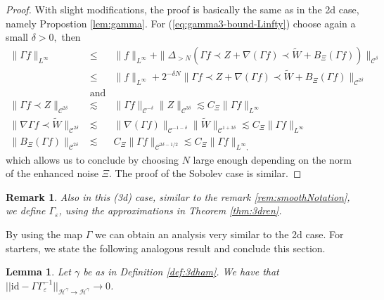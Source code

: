 \documentclass[11pt, oneside]{article}   	%
\newcommand{\nobracket}{}
\newcommand{\tmop}[1]{\ensuremath{\operatorname{#1}}}
\newtheorem{lemma}[theorem]{Lemma}
\newtheorem{remark}[theorem]{Remark}
\newcommand{\CC}{\mathscr{C}}
\begin{document}
\begin{proof}
	With slight modifications, the proof is basically the same as in the 2d case, namely Propostion \ref{lem:gamma}. For
	(\ref{eq:gamma3-bound-Linfty}) choose again a small $\delta > 0,$ then
	\begin{eqnarray*}
		\| \Gamma f \|_{L^{\infty}} & \le & \| f \|_{L^{\infty}} + \|
		\Delta_{> N} (\Gamma f \prec Z + \nabla (\Gamma f) \prec \widetilde{W} +
		B_{\Xi} (\Gamma f)) \|_{\CC^{\delta}}\\
		& \le & \| f \|_{L^{\infty}} + 2^{- \delta N} \| \nobracket \Gamma
		f \prec Z + \nabla (\Gamma f) \prec \widetilde{W} + B_{\Xi} (\Gamma f
		\nobracket) \|_{\CC^{2 \delta}}\\
		& \tmop{and} & \\
		\| \Gamma f \prec Z \|_{\CC^{2 \delta}} & \lesssim & \| \Gamma f
		\|_{\CC^{- \delta}} \| Z \|_{\CC^{3 \delta}} \lesssim
		C_{\Xi} \| \Gamma f \|_{L^{\infty}}\\
		\| \nabla \Gamma f \prec \widetilde{W} \|_{\CC^{2 \delta}} & \lesssim
		& \| \nabla (\Gamma f) \|_{\CC^{- 1 - \delta}} \| \widetilde{W}
		\|_{\CC^{1 + 3 \delta}} \lesssim C_{\Xi} \| \Gamma f
		\|_{L^{\infty}}\\
		\| B_{\Xi} (\Gamma f) \|_{\CC^{2 \delta}} & \lesssim & C_{\Xi} \| \Gamma f
		\|_{\CC^{2 \delta - 1 / 2}} \lesssim C_{\Xi} \| \Gamma f
		\|_{L^{\infty},}
	\end{eqnarray*}
	which allows us to conclude by choosing $N$ large enough depending on the norm of the 
	enhanced noise $\Xi$.
	The proof of the Sobolev case is similar.
\end{proof}

\begin{remark}\upshape\label{rem:smoothNotation2}
Also in this (3d) case, similar to the remark \ref{rem:smoothNotation}, we define  $\Gamma_\varepsilon$, using the approximations in Theorem \ref{thm:3dren}.  
\end{remark}

By using the map $\Gamma$ we can obtain an analysis very similar to the 2d case.  For starters, we state the following analogous result and conclude this section.

\begin{lemma} \label{lem:identityGammaconv3d}
	Let $\gamma$ be as  in Definition \ref{def:3dham}. We have that $|| \text{id} - \Gamma  \Gamma_\varepsilon^{-1}||_{\mathscr{H}^\gamma \rightarrow \mathscr{H}^\gamma} \rightarrow 0$.
\end{lemma}
\end{document}

